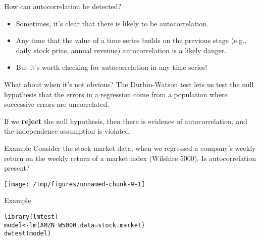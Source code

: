 \documentclass{beamer}\usepackage[]{graphicx}\usepackage[]{color}
\makeatletter
\def\maxwidth{ %
  \ifdim\Gin@nat@width>\linewidth
    \linewidth
  \else
    \Gin@nat@width
  \fi
}
\newcommand{\hlopt}[1]{\textcolor[rgb]{1,0.894,0.769}{#1}}%
\newcommand{\hlstd}[1]{\textcolor[rgb]{1,0.894,0.769}{#1}}%
\newcommand{\hlkwb}[1]{\textcolor[rgb]{0.804,0.776,0.451}{#1}}%
\newcommand{\hlkwc}[1]{\textcolor[rgb]{0.78,0.941,0.545}{#1}}%
\newcommand{\hlkwd}[1]{\textcolor[rgb]{1,0.78,0.769}{#1}}%
\newenvironment{kframe}{%
 \def\at@end@of@kframe{}%
 \ifinner\ifhmode%
  \def\at@end@of@kframe{\end{minipage}}%
  \begin{minipage}{\columnwidth}%
 \fi\fi%
 \def\FrameCommand##1{\hskip\@totalleftmargin \hskip-\fboxsep
 \colorbox{shadecolor}{##1}\hskip-\fboxsep
     \hskip-\linewidth \hskip-\@totalleftmargin \hskip\columnwidth}%
 \MakeFramed {\advance\hsize-\width
   \@totalleftmargin\z@ \linewidth\hsize
   \@setminipage}}%
 {\par\unskip\endMakeFramed%
 \at@end@of@kframe}
\newenvironment{knitrout}{}{} %
\makeatother
\begin{document}
\begin{darkframes}
    \begin{frame}{How can autocorrelation be detected?}
      \begin{itemize}
        \item Sometimes, it's clear that there is likely to be autocorrelation.
        \item Any time that the value of a time series builds on the previous stage (e.g., daily stock price, annual revenue) autocorrelation is a likely danger.
        \item But it's worth checking for autocorrelation in any time series!
      \end{itemize}
    \end{frame}

    \begin{frame}{What about when it's not obvious?}
      The \alert{Durbin-Watson test} lets us test the null hypothesis that the errors in a regression come from a population where successive errors are uncorrelated.

      \bigskip\pause

      If we \textbf{reject} the null hypothesis, then there is evidence of autocorrelation, and the independence assumption is violated.
    \end{frame}

    \begin{frame}{Example}
      Consider the stock market data, when we regressed a company's weekly return on the weekly return of a market index (Wilshire 5000). Is autocorrelation present?

\begin{knitrout}
\color{fgcolor}
\texttt{[image: /tmp/figures/unnamed-chunk-9-1]} 

\end{knitrout}
    \end{frame}

    \begin{frame}[fragile]{Example}
      \fontsm
\begin{knitrout}
\color{fgcolor}\begin{kframe}
\begin{alltt}
\hlkwd{library}\hlstd{(lmtest)}
\hlstd{model} \hlkwb{<-} \hlkwd{lm}\hlstd{(AMZN} \hlopt{~} \hlstd{W5000,} \hlkwc{data}\hlstd{=stock.market)}
\hlkwd{dwtest}\hlstd{(model)}
\end{alltt}
\begin{verbatim}


\end{verbatim}
\end{kframe}
\end{knitrout}
\end{frame}
\end{darkframes}
\end{document}
